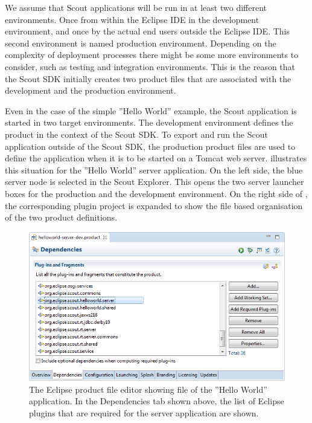 \documentclass[a4paper,10pt,twoside]{book}
\begin{document}
We assume that Scout applications will be run in at least two different environments.
Once from within the Eclipse IDE in the development environment, and once by the actual end users outside the Eclipse IDE. 
This second environment is named production environment. 
Depending on the complexity of deployment processes there might be some more environments to consider, such as testing and integration environments. 
This is the reason that the Scout SDK initially creates two product files that are associated with the development and the production environment.

Even in the case of the simple ''Hello World'' example, the Scout application is started in two target environments.
The development environment defines the product in the context of the Scout SDK.
To export and run the Scout application outside of the Scout SDK, the production product files are used to define the application when it is to be started on a Tomcat web server.
 illustrates this situation for the ''Hello World'' server application. 
On the left side, the blue server node is selected in the Scout Explorer.
This opens the two server launcher boxes for the production and the development environment.
On the right side of , the corresponding plugin project  is expanded to show the file based organisation of the two product definitions.

\begin{figure}
\includegraphics[width=14cm]{sdk_server_dev_product.png} 
\caption{The Eclipse product file editor showing file  of the ''Hello World'' application.
In the Dependencies tab shown above, the list of Eclipse plugins that are required for the server application are shown.
}
\end{figure}
\end{document}
